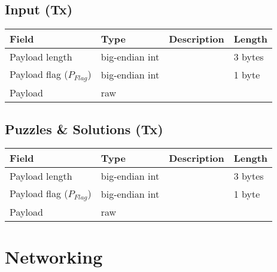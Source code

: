 \documentclass[a4paper,10pt]{article}
\begin{document}
        \subsection{Input (Tx)}
           \begin{tabularx}{\textwidth}{|l|l|X|l|}
            \hline Field & Type & Description & Length \\ \hline
            \hline Payload length & big-endian int &  & 3 bytes \\
            \hline Payload flag ($P_{Flag}$) & big-endian int &  & 1 byte \\
            \hline Payload & raw & & \\
            \hline
            \end{tabularx}
        \subsection{Puzzles \& Solutions (Tx)}
           \begin{tabularx}{\textwidth}{|l|l|X|l|}
            \hline Field & Type & Description & Length \\ \hline
            \hline Payload length & big-endian int &  & 3 bytes \\
            \hline Payload flag ($P_{Flag}$) & big-endian int &  & 1 byte \\
            \hline Payload & raw & & \\
            \hline
            \end{tabularx}
            \subsubsection{}

    \section{Networking}
\end{document}
